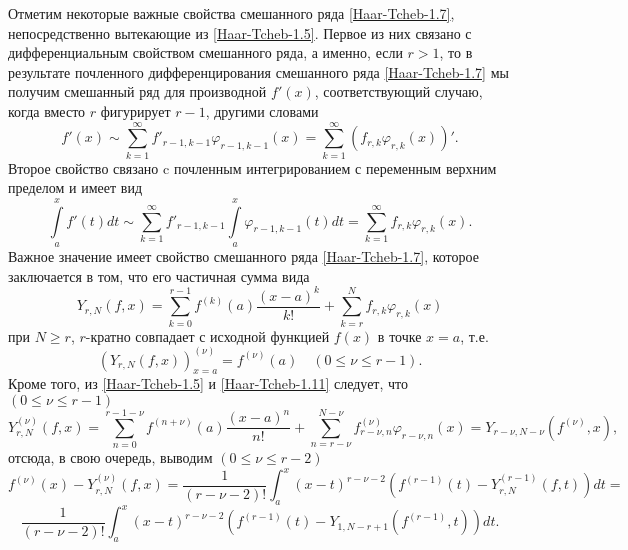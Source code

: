 Отметим некоторые важные свойства смешанного ряда \eqref{Haar-Tcheb-1.7}, непосредственно вытекающие из \eqref{Haar-Tcheb-1.5}. Первое из них связано с дифференциальным свойством смешанного ряда, а именно, если $r>1$, то в результате почленного дифференцирования смешанного ряда \eqref{Haar-Tcheb-1.7} мы получим смешанный ряд для производной $f'(x)$, соответствующий случаю, когда вместо $r$ фигурирует $r-1$, другими словами
\begin{equation}\label{Haar-Tcheb-1.9}
f'(x)\sim  \sum_{k=1}^\infty f'_{r-1,k-1}\varphi_{r-1,k-1}(x)=\sum_{k=1}^\infty (f_{r,k}\varphi_{r,k}(x))'.
\end{equation}
Второе свойство связано c почленным интегрированием с переменным верхним пределом и имеет вид
\begin{equation}\label{Haar-Tcheb-1.10}
\int\limits_a^xf'(t)dt\sim \sum_{k=1}^\infty f'_{r-1,k-1}\int\limits_a^x\varphi_{r-1,k-1}(t)dt=\sum_{k=1}^\infty f_{r,k}\varphi_{r,k}(x).
\end{equation}
Важное значение имеет свойство  смешанного ряда \eqref{Haar-Tcheb-1.7}, которое заключается в том, что его частичная сумма вида
\begin{equation}\label{Haar-Tcheb-1.11}
Y_{r,N}(f,x)=\sum_{k=0}^{r-1} f^{(k)}(a)\frac{(x-a)^k}{k!}+ \sum_{k=r}^{N} f_{r,k}\varphi_{r,k}(x)
\end{equation}
 при   $N\ge r$, $r$-кратно совпадает с исходной функцией $f(x)$ в точке $x=a$, т.е.
\begin{equation}\label{Haar-Tcheb-1.12}
(Y_{r,N}(f,x))^{(\nu)}_{x=a}=f^{(\nu)}(a)\quad (0\le\nu\le r-1).
\end{equation}
Кроме того, из \eqref{Haar-Tcheb-1.5} и \eqref{Haar-Tcheb-1.11} следует, что $(0\le\nu\le r-1)$
\begin{equation}\label{Haar-Tcheb-1.13}
 Y_{r,N}^{(\nu)}(f,x)=\sum_{n=0}^{r-1-\nu} f^{(n+\nu)}(a)\frac{(x-a)^n}{n!}+ \sum_{n=r-\nu}^{N-\nu} f_{r-\nu,n}^{(\nu)}\varphi_{r-\nu,n}(x)=Y_{r-\nu,N-\nu}(f^{(\nu)},x),
 \end{equation}
отсюда, в свою очередь, выводим $(0\le\nu\le r-2)$
 $$
f^{(\nu)}(x)-Y_{r,N}^{(\nu)}(f,x)= \frac{1}{(r-\nu-2)!}\int_a^x (x-t)^{r-\nu-2}(f^{(r-1)}(t)-Y_{r,N}^{(r-1)}(f,t))dt=
$$
  \begin{equation}\label{Haar-Tcheb-1.14}
\frac{1}{(r-\nu-2)!}\int_a^x (x-t)^{r-\nu-2}(f^{(r-1)}(t)-Y_{1,N-r+1}(f^{(r-1)},t))dt.
 \end{equation}

